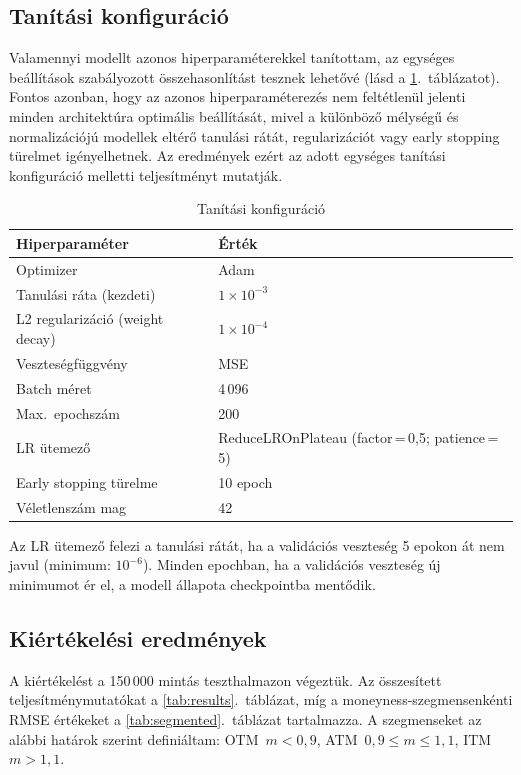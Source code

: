 \subsection{Tanítási konfiguráció}

Valamennyi modellt azonos hiperparaméterekkel tanítottam, az egységes beállítások szabályozott összehasonlítást tesznek lehetővé (lásd a \ref{tab:training}.~táblázatot). Fontos azonban, hogy az azonos hiperparaméterezés nem feltétlenül jelenti minden architektúra optimális beállítását, mivel a különböző mélységű és normalizációjú modellek eltérő tanulási rátát, regularizációt vagy early stopping türelmet igényelhetnek. Az eredmények ezért az adott egységes tanítási konfiguráció melletti teljesítményt mutatják.

\begin{table}[H]
\centering
\caption{Tanítási konfiguráció}
\label{tab:training}
\begin{tabular}{ll}
\toprule
Hiperparaméter & Érték \\
\midrule
Optimizer & Adam \\
Tanulási ráta (kezdeti) & $1 \times 10^{-3}$ \\
L2 regularizáció (weight decay) & $1 \times 10^{-4}$ \\
Veszteségfüggvény & MSE \\
Batch méret & 4\,096 \\
Max.\ epochszám & 200 \\
LR ütemező & ReduceLROnPlateau (factor\,=\,0{,}5; patience\,=\,5) \\
Early stopping türelme & 10 epoch \\
Véletlenszám mag & 42 \\
\bottomrule
\end{tabular}
\end{table}

Az LR ütemező felezi a tanulási rátát, ha a validációs veszteség 5 epokon át
nem javul (minimum: $10^{-6}$).
Minden epochban, ha a validációs veszteség új minimumot ér el, a modell állapota
checkpointba mentődik.

\subsection{Kiértékelési eredmények}
\label{sec:eval}

A kiértékelést a 150\,000 mintás teszthalmazon végeztük.
Az összesített teljesítménymutatókat a \ref{tab:results}.~táblázat, míg a moneyness-szegmensenkénti
RMSE értékeket a \ref{tab:segmented}.~táblázat tartalmazza.
A szegmenseket az alábbi határok szerint definiáltam: OTM~$m < 0{,}9$, ATM~$0{,}9 \leq m \leq 1{,}1$,
ITM~$m > 1{,}1$.

